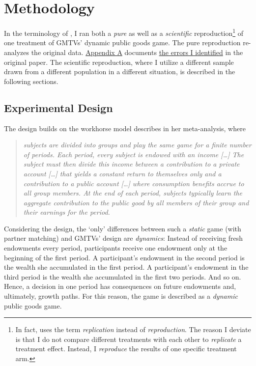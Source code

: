 \documentclass[
  authoryear,
  review,
  3p,
  onecolumn]{elsarticle}
\begin{document}
\hypertarget{sec-methods}{%
\section{Methodology}\label{sec-methods}}

In the terminology of \citet{Hamermesh2007}, I ran both a \emph{pure} as
well as a \emph{scientific} reproduction\footnote{In fact,
  \citet{Hamermesh2007} uses the term \emph{replication} instead of
  \emph{reproduction}. The reason I deviate is that I do not compare
  different treatments with each other to \emph{replicate} a treatment
  effect. Instead, I \emph{reproduce} the results of one specific
  treatment arm.} of one treatment of GMTVs' dynamic public goods game.
The pure reproduction re-analyzes the original data.
\protect\hyperlink{A:-Pure-Replication}{Appendix A} documents
\href{}{the errors I identified} in the original paper. The scientific
reproduction, where I utilize a different sample drawn from a different
population in a different situation, is described in the following
sections.

\hypertarget{sec-design}{%
\subsection{Experimental Design}\label{sec-design}}

The design builds on the workhorse model \citet[p.301]{Zelmer2003}
describes in her meta-analysis, where

\begin{quote}
\emph{subjects are divided into groups and play the same game for a
finite number of periods. Each period, every subject is endowed with an
income {[}\ldots{]} The subject must then divide this income between a
contribution to a private account {[}\ldots{]} that yields a constant
return to themselves only and a contribution to a public account
{[}\ldots{]} where consumption benefits accrue to all group members. At
the end of each period, subjects typically learn the aggregate
contribution to the public good by all members of their group and their
earnings for the period.}
\end{quote}

Considering the design, the `only' differences between such a
\emph{static} game (with partner matching) and GMTVs' design are
\emph{dynamics}: Instead of receiving fresh endowments every period,
participants receive one endowment only at the beginning of the first
period. A participant's endowment in the second period is the wealth she
accumulated in the first period. A participant's endowment in the third
period is the wealth she accumulated in the first two periods. And so
on. Hence, a decision in one period has consequences on future
endowments and, ultimately, growth paths. For this reason, the game is
described as a \emph{dynamic} public goods game.
\end{document}
